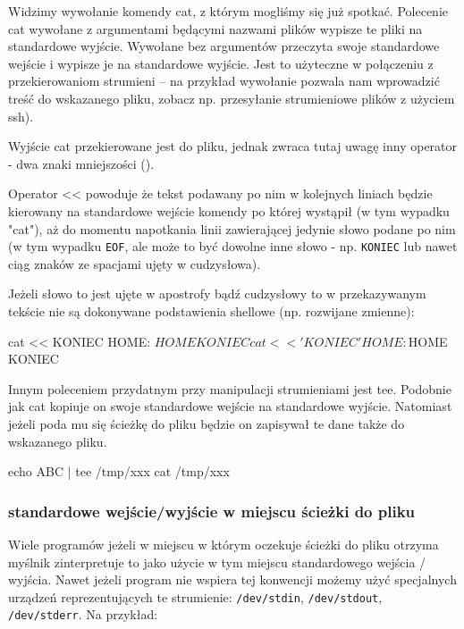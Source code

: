 Widzimy wywołanie komendy cat, z którym mogliśmy się już spotkać.
Polecenie cat wywołane z argumentami będącymi nazwami plików wypisze te pliki na standardowe wyjście.
Wywołane bez argumentów przeczyta swoje standardowe wejście i wypisze je na standardowe wyjście.
Jest to użyteczne w połączeniu z przekierowaniom strumieni – na przykład wywołanie  pozwala nam wprowadzić treść do wskazanego pliku, zobacz np. przesyłanie strumieniowe plików z użyciem ssh).

Wyjście cat przekierowane jest do pliku, jednak zwraca tutaj uwagę inny operator - dwa znaki mniejszości (\shell{<<}).

Operator << powoduje że tekst podawany po nim w kolejnych liniach
będzie kierowany na standardowe wejście komendy po której wystąpił (w tym wypadku "cat"),
aż do momentu napotkania linii zawierającej jedynie słowo podane po nim
(w tym wypadku \texttt{EOF}, ale może to być dowolne inne słowo - np. \texttt{KONIEC}
lub nawet ciąg znaków ze spacjami ujęty w cudzysłowa).

Jeżeli słowo to jest ujęte w apostrofy bądź cudzysłowy to w przekazywanym tekście
nie są dokonywane podstawienia shellowe (np. rozwijane zmienne):

\begin{CodeFrame*}[bash]{}
cat << KONIEC
HOME: $HOME
KONIEC

cat << 'KONIEC'
HOME: $HOME
KONIEC
\end{CodeFrame*}



Innym poleceniem przydatnym przy manipulacji strumieniami jest tee.
Podobnie jak cat kopiuje on swoje standardowe wejście na standardowe wyjście.
Natomiast jeżeli poda mu się ścieżkę do pliku będzie on zapisywał
te dane także do wskazanego pliku.

\begin{CodeFrame*}[bash]{}
echo ABC | tee /tmp/xxx
cat /tmp/xxx
\end{CodeFrame*}

\subsubsection{standardowe wejście/wyjście w miejscu ścieżki do pliku}

Wiele programów jeżeli w miejscu w którym oczekuje ścieżki do pliku otrzyma myślnik
zinterpretuje to jako użycie w tym miejscu standardowego wejścia / wyjścia.
Nawet jeżeli program nie wspiera tej konwencji możemy użyć specjalnych urządzeń
reprezentujących te strumienie: \texttt{/dev/stdin}, \texttt{/dev/stdout}, \texttt{/dev/stderr}. Na przykład:

